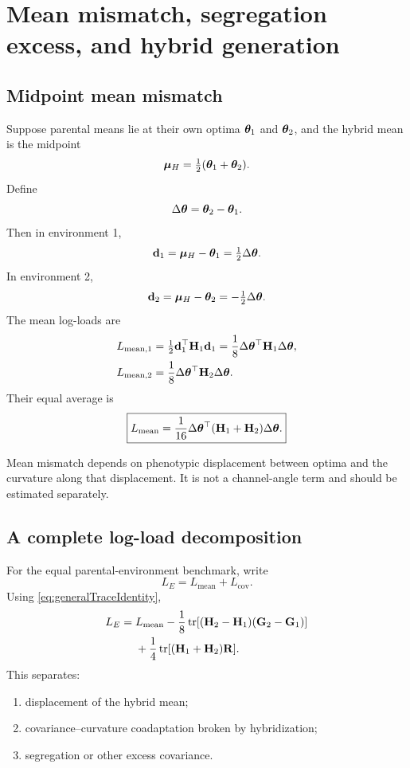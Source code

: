 \chapter{Mean mismatch, segregation excess, and hybrid generation}

\section{Midpoint mean mismatch}

Suppose parental means lie at their own optima \(\boldsymbol{\theta}_1\) and \(\boldsymbol{\theta}_2\), and the hybrid mean is the midpoint
\begin{equation}
\boldsymbol{\mu}_H=\tfrac12(\boldsymbol{\theta}_1+\boldsymbol{\theta}_2).
\end{equation}
Define
\begin{equation}
\Delta\boldsymbol{\theta}=\boldsymbol{\theta}_2-\boldsymbol{\theta}_1.
\end{equation}
Then in environment 1,
\begin{equation}
\mathbf d_1=\boldsymbol{\mu}_H-\boldsymbol{\theta}_1=\tfrac12\Delta\boldsymbol{\theta}.
\end{equation}
In environment 2,
\begin{equation}
\mathbf d_2=\boldsymbol{\mu}_H-\boldsymbol{\theta}_2=-\tfrac12\Delta\boldsymbol{\theta}.
\end{equation}
The mean log-loads are
\begin{align}
L_{\mathrm{mean},1}
&=\tfrac12\mathbf d_1^\top\mathbf{H}_1\mathbf d_1
=\frac18\Delta\boldsymbol{\theta}^\top\mathbf{H}_1\Delta\boldsymbol{\theta},\\
L_{\mathrm{mean},2}
&=\frac18\Delta\boldsymbol{\theta}^\top\mathbf{H}_2\Delta\boldsymbol{\theta}.
\end{align}
Their equal average is
\begin{equation}
\boxed{
L_{\mathrm{mean}}
=\frac1{16}\Delta\boldsymbol{\theta}^\top(\mathbf{H}_1+\mathbf{H}_2)\Delta\boldsymbol{\theta}.}
\label{eq:midpointMeanLoad}
\end{equation}

\inwords Mean mismatch depends on phenotypic displacement between optima and the curvature along that displacement. It is not a channel-angle term and should be estimated separately.

\section{A complete log-load decomposition}

For the equal parental-environment benchmark, write
\begin{equation}
L_E=L_{\mathrm{mean}}+L_{\mathrm{cov}}.
\end{equation}
Using \cref{eq:generalTraceIdentity},
\begin{align}
L_E
={}&L_{\mathrm{mean}}
-\frac18\operatorname{tr}[(\mathbf{H}_2-\mathbf{H}_1)(\mathbf{G}_2-\mathbf{G}_1)]\\
&+\frac14\operatorname{tr}[(\mathbf{H}_1+\mathbf{H}_2)\mathbf{R}].
\label{eq:completeHybridLogLoad}
\end{align}
This separates:
\begin{enumerate}[leftmargin=1.6em]
\item displacement of the hybrid mean;
\item covariance--curvature coadaptation broken by hybridization;
\item segregation or other excess covariance.
\end{enumerate}


